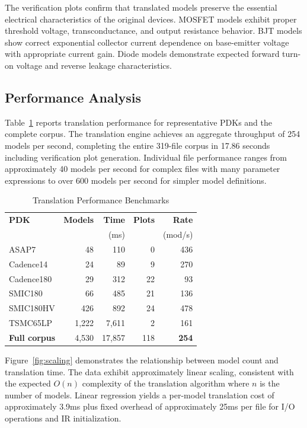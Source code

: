 \documentclass[conference]{IEEEtran}
\begin{document}
The verification plots confirm that translated models preserve the essential electrical characteristics of the original devices. MOSFET models exhibit proper threshold voltage, transconductance, and output resistance behavior. BJT models show correct exponential collector current dependence on base-emitter voltage with appropriate current gain. Diode models demonstrate expected forward turn-on voltage and reverse leakage characteristics.

\subsection{Performance Analysis}

Table~\ref{tab:performance} reports translation performance for representative PDKs and the complete corpus. The translation engine achieves an aggregate throughput of 254 models per second, completing the entire 319-file corpus in 17.86 seconds including verification plot generation. Individual file performance ranges from approximately 40 models per second for complex files with many parameter expressions to over 600 models per second for simpler model definitions.

\begin{table}[!t]
\caption{Translation Performance Benchmarks}
\label{tab:performance}
\centering
\renewcommand{\arraystretch}{1.15}
\begin{tabular}{@{}lrrrr@{}}
\toprule
\textbf{PDK} & \textbf{Models} & \textbf{Time} & \textbf{Plots} & \textbf{Rate} \\
 & & (ms) & & (mod/s) \\
\midrule
ASAP7 & 48 & 110 & 0 & 436 \\
Cadence14 & 24 & 89 & 9 & 270 \\
Cadence180 & 29 & 312 & 22 & 93 \\
SMIC180 & 66 & 485 & 21 & 136 \\
SMIC180HV & 426 & 892 & 24 & 478 \\
TSMC65LP & 1,222 & 7,611 & 2 & 161 \\
\midrule
\textbf{Full corpus} & 4,530 & 17,857 & 118 & \textbf{254} \\
\bottomrule
\end{tabular}
\end{table}

Figure~\ref{fig:scaling} demonstrates the relationship between model count and translation time. The data exhibit approximately linear scaling, consistent with the expected $O(n)$ complexity of the translation algorithm where $n$ is the number of models. Linear regression yields a per-model translation cost of approximately 3.9ms plus fixed overhead of approximately 25ms per file for I/O operations and IR initialization.
\end{document}
